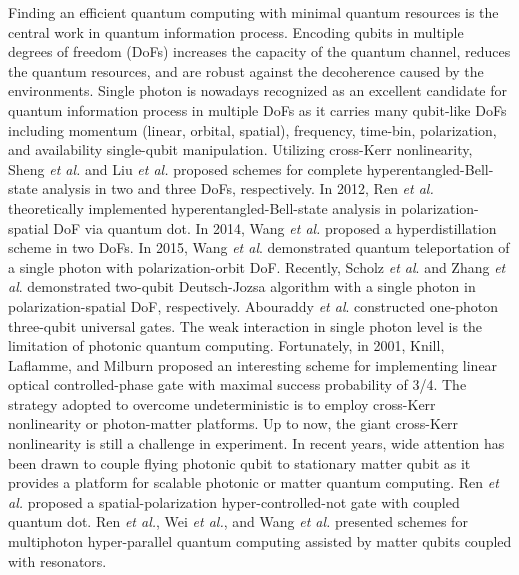 \documentclass[showpacs,preprintnumbers,showkeys,amsmath,amssymb]{revtex4}%
\begin{document}
Finding an efficient quantum computing with minimal quantum resources is the central work in quantum information process. Encoding  qubits in multiple degrees of freedom (DoFs) increases the capacity of the quantum channel, reduces the quantum resources, and are robust against the decoherence caused by the environments. Single photon is nowadays recognized as an excellent candidate for quantum information process in multiple DoFs as it carries many qubit-like DoFs\cite{multiple} including momentum (linear, orbital, spatial), frequency, time-bin, polarization, and availability single-qubit manipulation. Utilizing cross-Kerr nonlinearity, Sheng \emph{et al.}\cite{hyper-Bell-Sheng} and Liu \emph{et al.}\cite{hyper-Bell-Liuqian} proposed schemes for complete hyperentangled-Bell-state analysis in two and three DoFs, respectively. In  2012, Ren \emph{et al.}\cite{hyper-Bell-Ren} theoretically implemented hyperentangled-Bell-state analysis in polarization-spatial DoF via quantum dot. In 2014, Wang \emph{et al.}\cite{hyperdistillation} proposed a hyperdistillation scheme in two DoFs. In 2015, Wang \emph{et al}.\cite{pan} demonstrated quantum teleportation of a single photon with polarization-orbit DoF. Recently, Scholz \emph{et al}.\cite{Scholz-DJ} and Zhang \emph{et al}.\cite{Zhang-DJ} demonstrated two-qubit Deutsch-Jozsa algorithm with a single photon in polarization-spatial DoF, respectively. Abouraddy \emph{et al}.\cite{one-photon-three-qubit} constructed one-photon three-qubit universal gates. The weak interaction in single photon level is the limitation of photonic quantum computing. Fortunately, in 2001, Knill, Laflamme, and Milburn\cite{KLM} proposed an interesting scheme for implementing linear optical controlled-phase gate with maximal success probability of 3/4. The strategy adopted to overcome undeterministic is to employ cross-Kerr nonlinearity\cite{kerr1} or photon-matter platforms\cite{platform1,platform2}. Up to now, the giant cross-Kerr nonlinearity is still a challenge in experiment. In recent years, wide attention has been drawn to couple flying photonic qubit to stationary matter qubit as it provides a platform for scalable photonic or matter quantum computing. Ren \emph{et al.}\cite{hyper-CNOT1,hyper-CNOT2} proposed a spatial-polarization hyper-controlled-not gate with coupled quantum dot. Ren \emph{et al.}\cite{Hyper-Toffoli-Ren}, Wei \emph{et al.}\cite{Hyper-Toffoli-Wei}, and Wang \emph{et al.}\cite{Hyper-Toffoli-Wang} presented schemes for multiphoton hyper-parallel quantum computing assisted by matter qubits coupled with resonators.
\end{document}
